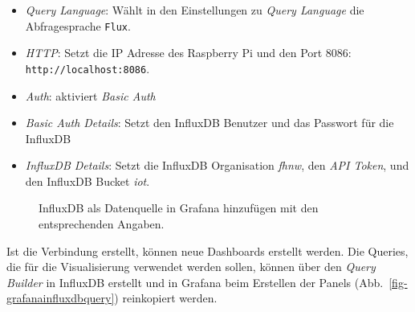 \documentclass[
  11pt,
  a4paperpaper,
  oneside, openany  ,captions=tableheading
]{scrbook}
\providecommand{\tightlist}{%
  \setlength{\itemsep}{0pt}\setlength{\parskip}{0pt}}
\theoremstyle{definition}
\theoremstyle{remark}
\begin{document}
\begin{itemize}
\tightlist
\item
  \emph{Query Language}: Wählt in den Einstellungen zu \emph{Query
  Language} die Abfragesprache \texttt{Flux}.
\item
  \emph{HTTP}: Setzt die IP Adresse des Raspberry Pi und den Port 8086:
  \texttt{http://localhost:8086}.
\item
  \emph{Auth}: aktiviert \emph{Basic Auth}
\item
  \emph{Basic Auth Details}: Setzt den InfluxDB Benutzer und das
  Passwort für die InfluxDB
\item
  \emph{InfluxDB Details}: Setzt die InfluxDB Organisation \emph{fhnw},
  den \emph{API Token}, und den InfluxDB Bucket \emph{iot}.
\end{itemize}

\begin{figure}


\caption{\label{fig-grafanainfluxdb}InfluxDB als Datenquelle in Grafana
hinzufügen mit den entsprechenden Angaben.}

\end{figure}%

Ist die Verbindung erstellt, können neue Dashboards erstellt werden. Die
Queries, die für die Visualisierung verwendet werden sollen, können über
den \emph{Query Builder} in InfluxDB erstellt und in Grafana beim
Erstellen der Panels (Abb.~\ref{fig-grafanainfluxdbquery}) reinkopiert
werden.
\end{document}
